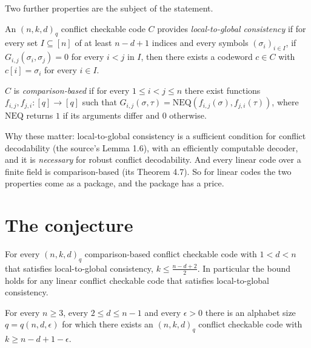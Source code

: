 \documentclass{conjura-conjecture}
\newcommand{\NEQ}{\mathrm{NEQ}}
\begin{document}
Two further properties are the subject of the statement.

\begin{definition}\label{def:l2g}
An $(n,k,d)_{q}$ conflict checkable code $C$ provides \emph{local-to-global
consistency} if for every set $I \subseteq [n]$ of at least $n-d+1$
indices and every symbols $(\sigma_{i})_{i \in I}$, if $G_{i,j}(\sigma_i,
\sigma_j) = 0$ for every $i < j$ in $I$, then there exists a codeword $c
\in C$ with $c[i] = \sigma_{i}$ for every $i \in I$.
\end{definition}

\begin{definition}\label{def:cb}
$C$ is \emph{comparison-based} if for every $1 \le i < j \le n$ there
exist functions $f_{i,j}, f_{j,i} : [q] \to [q]$ such that
$G_{i,j}(\sigma, \tau) = \NEQ(f_{i,j}(\sigma), f_{j,i}(\tau))$, where
$\NEQ$ returns $1$ if its arguments differ and $0$ otherwise.
\end{definition}

Why these matter: local-to-global consistency is a sufficient condition
for conflict decodability (the source's Lemma 1.6), with an efficiently
computable decoder, and it is \emph{necessary} for robust conflict
decodability. And every linear code over a finite field is
comparison-based (its Theorem 4.7). So for linear codes the two
properties come as a package, and the package has a price.

\section{The conjecture}\label{sec:conjectures}

\begin{theorem}\label{thm:bound}
For every $(n,k,d)_{q}$ comparison-based conflict checkable code with
$1 < d < n$ that satisfies local-to-global consistency, $k \le
\frac{n-d+2}{2}$. In particular the bound holds for any linear conflict
checkable code that satisfies local-to-global consistency.
\end{theorem}

\begin{theorem}\label{thm:amds}
For every $n \ge 3$, every $2 \le d \le n-1$ and every $\epsilon > 0$
there is an alphabet size $q = q(n,d,\epsilon)$ for which there exists an
$(n,k,d)_{q}$ conflict checkable code with $k \ge n-d+1-\epsilon$.
\end{theorem}
\end{document}
